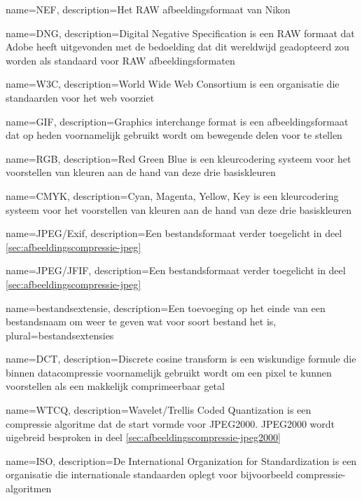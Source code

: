 {
	name={NEF},
	description={Het RAW afbeeldingsformaat van Nikon}
}

{
	name={DNG},
	description={Digital Negative Specification is een RAW formaat dat Adobe heeft uitgevonden met de bedoelding dat dit wereldwijd geadopteerd zou worden als standaard voor RAW afbeeldingsformaten}
}

{
	name={W3C},
	description={World Wide Web Consortium is een organisatie die standaarden voor het web voorziet}
}

{
	name={GIF},
	description={Graphics interchange format is een afbeeldingsformaat dat op heden voornamelijk gebruikt wordt om bewegende delen voor te stellen}
}

{
	name={RGB},
	description={Red Green Blue is een kleurcodering systeem voor het voorstellen van kleuren aan de hand van deze drie basiskleuren}
}

{
	name={CMYK},
	description={Cyan, Magenta, Yellow, Key is een kleurcodering systeem voor het voorstellen van kleuren aan de hand van deze drie basiskleuren}
}

{
	name={JPEG/Exif},
	description={Een bestandsformaat verder toegelicht in deel \ref{sec:afbeeldingscompressie-jpeg}}
}

{
	name={JPEG/JFIF},
	description={Een bestandsformaat verder toegelicht in deel \ref{sec:afbeeldingscompressie-jpeg}}
}

{
	name={bestandsextensie},
	description={Een toevoeging op het einde van een bestandsnaam om weer te geven wat voor soort bestand het is},
	plural={bestandsextensies}
}

{
	name={DCT},
	description={Discrete cosine transform is een wiskundige formule die binnen datacompressie voornamelijk gebruikt wordt om een pixel te kunnen voorstellen als een makkelijk comprimeerbaar getal}
}

{
	name={WTCQ},
	description={Wavelet/Trellis Coded Quantization is een compressie algoritme dat de start vormde voor JPEG2000. JPEG2000 wordt uigebreid besproken in deel \ref{sec:afbeeldingscompressie-jpeg2000}}
}

{
	name={ISO},
	description={De International Organization for Standardization is een organisatie die internationale standaarden oplegt voor bijvoorbeeld compressie-algoritmen}
}

